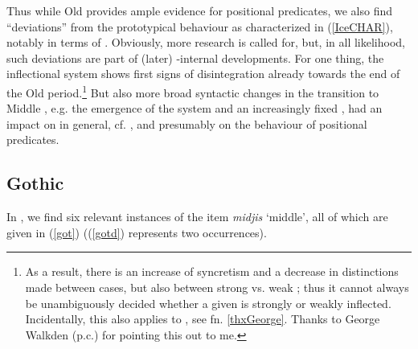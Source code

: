 \documentclass[output=paper,colorlinks,citecolor=brown]{langscibook}
\begin{document}
Thus while Old  provides ample evidence for positional predicates, we also find ``deviations'' from the prototypical behaviour as characterized in (\ref{IceCHAR}), notably in terms of .  
Obviously, more research is called for, but, in all likelihood, such deviations are part of (later) -internal developments. For one thing, the inflectional system shows first signs of disintegration already towards the end of the Old  period.\footnote{\label{thx2}As a result, there is an increase of syncretism  and a decrease in distinctions made between cases, but also between strong vs. weak ; thus it cannot always be unambiguously decided whether a given  is  strongly or weakly inflected. Incidentally, this also applies to , see fn. \ref{thxGeorge}. Thanks to George Walkden (p.c.) for pointing this out to me.} But also more broad syntactic changes in the transition to Middle , e.g. the emergence of the  system and an increasingly fixed ,  had an impact on   in general, cf. \citet{Fischer2004,Fischer06}, and presumably on the behaviour of positional predicates. 



\subsection{Gothic} 
\label{sec:10:got}


In , we find six relevant instances of the item \textit{midjis} `{middle}', all of which are given in (\ref{got}) ((\ref{gotd}) represents two occurrences).
\end{document}
